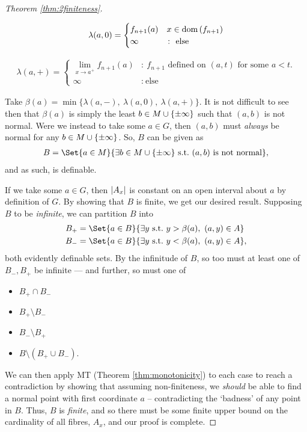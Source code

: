 \begin{proof}[Theorem \ref{thm:2finiteness}]
\begin{description}
		\item  
			\begin{align*}
						\lambda(a, 0) = \begin{cases} 
									      f_{n + 1}(a) & x \in \dom{f_{n+1}} \\
									      \infty & \colon \ \textrm{else}
									   \end{cases}
			\end{align*}
		
		\item  
			\begin{align*}
						\lambda(a, +) = \begin{cases} 
									      \displaystyle\lim_{x \to a^{+}} f_{n + 1}(a) & \colon \ \textrm{$f_{n+1}$ defined on $(a, t)$ for some $a < t$.} \\
									      \infty & \colon \ \textrm{else}
									   \end{cases}
			\end{align*}
	\end{description}
	
	Take $\beta(a) = \min{\{ \lambda(a, -),\ \lambda(a, 0),\ \lambda(a, +) \}}$. It is not difficult to see then that $\beta(a)$ is simply the least $b \in M \cup \{ \pm \infty \}$ such that $(a, b)$ is not normal. Were we instead to take some $a \in G$, then $(a, b)$ must \emph{always} be normal for any $b \in M \cup \{ \pm \infty \}$. So, $B$ can be given as 
	\begin{align*}
		B = \Set{a \in M}{\exists b \in \Minf \ \textrm{s.t.} \ (a, b) \ \textrm{is not normal}},
	\end{align*}
	and as such, is definable.
	
	If we take some $a \in G$, then $\vert A_x\vert$ is constant on an open interval about $a$ by definition of $G$. By showing that $B$ is finite, we get our desired result. Supposing $B$ to be \emph{infinite}, we can partition $B$ into
	\begin{align*}
		B_+ &= \Set{a \in B}{\exists y \ \textrm{s.t.} \ y > \beta(a), \ (a, y) \in A} \\
		B_- &= \Set{a \in B}{\exists y \ \textrm{s.t.} \ y < \beta(a), \ (a, y) \in A},
	\end{align*}
	both evidently definable sets. By the infinitude of $B$, so too must at least one of $B_-, B_+$ be infinite — and further, so must one of 
	\begin{itemize}
		\item $B_+ \cap B_-$ 
		\item $B_+ \setminus B_-$
		\item $B_- \setminus B_+$
		\item $B \setminus (B_+ \cup B_-)$.
	\end{itemize}
	We can then apply MT (Theorem \ref{thm:monotonicity}) to each case to reach a contradiction by showing that assuming non-finiteness, we \emph{should} be able to find a normal point with first coordinate $a$ -- contradicting the `badness' of any point in $B$. Thus, $B$ is \emph{finite}, and so there must be some finite upper bound on the cardinality of all fibres, $A_x$, and our proof is complete.
\end{proof}



